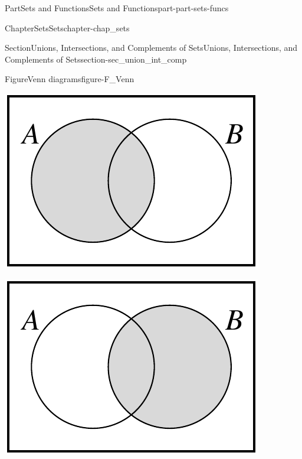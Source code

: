\documentclass[oneside,10pt,]{book}
\numberwithin{equation}{chapter}
\begin{document}
\begin{partptx}{Part}{Sets and Functions}{}{Sets and Functions}{}{}{part-part-sets-funcs}
\begin{chapterptx}{Chapter}{Sets}{}{Sets}{}{}{chapter-chap_sets}
\begin{sectionptx}{Section}{Unions, Intersections, and Complements of Sets}{}{Unions, Intersections, and Complements of Sets}{}{}{section-sec_union_int_comp}
\begin{figureptx}{Figure}{Venn diagrams}{figure-F_Venn}{}
\begin{sidebyside}{3}{0}{0}{0}
\begin{sbspanel}{0.333333333333333}
\includegraphics[width=\linewidth]{external/Venn_Diagram_A.pdf}
\end{sbspanel}%
\begin{sbspanel}{0.333333333333333}%
\includegraphics[width=\linewidth]{external/Venn_Diagram_B.pdf}
\end{sbspanel}%
\begin{sbspanel}{0.333333333333333}%

\end{sbspanel}
\end{sidebyside}
\end{figureptx}
\end{sectionptx}
\end{chapterptx}
\end{partptx}
\end{document}
